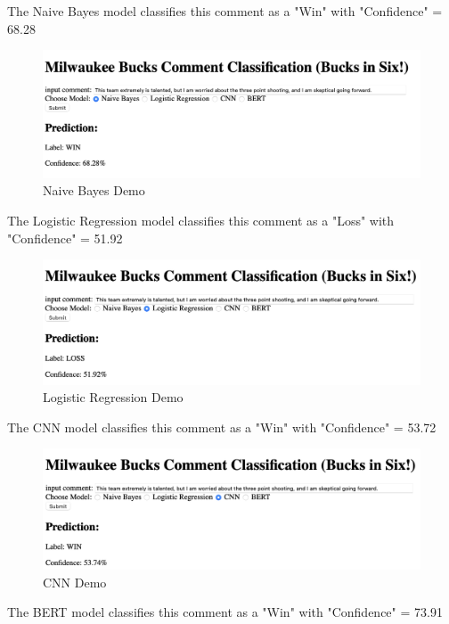 \documentclass[twocolumn]{article}
\begin{document}
The Naive Bayes model classifies this comment as a "Win" with "Confidence" = 68.28%

\begin{figure}[H]
    \centering
    \includegraphics[width=\linewidth]{NBDEMO.png}
    \caption{Naive Bayes Demo}
\end{figure}

The Logistic Regression model classifies this comment as a "Loss" with "Confidence" = 51.92%

\begin{figure}[H]
    \centering
    \includegraphics[width=\linewidth]{LRDEMO.png}
    \caption{Logistic Regression Demo}
\end{figure}

The CNN model classifies this comment as a "Win" with "Confidence" = 53.72%

\begin{figure}[H]
    \centering
    \includegraphics[width=\linewidth]{CNNDEMO.png}
    \caption{CNN Demo}
\end{figure}

The BERT model classifies this comment as a "Win" with "Confidence" = 73.91%
\end{document}
